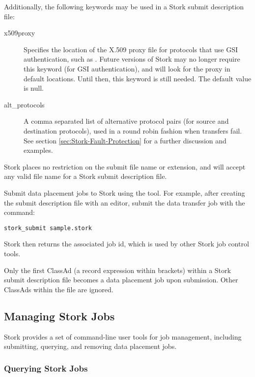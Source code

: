 Additionally, the following keywords may be used in 
a Stork submit description file:

\begin{description}
    \item[x509proxy] Specifies the location of the
    X.509 proxy file for protocols
    that use GSI authentication, such as .
    Future versions of
    Stork may no longer require this keyword (for GSI authentication),
    and will look for the proxy in default locations.
    Until then, this keyword is still needed.
    The default value is null.

    \item[alt\_protocols] A comma separated list of
    alternative protocol pairs (for source and destination protocols),
    used in a round robin fashion
    when transfers fail.
    See section \ref{sec:Stork-Fault-Protection} for a further discussion
    and examples.


\end{description}

Stork places no restriction on the submit file name or extension, and will
accept any valid file name for a Stork submit description file.

Submit data placement jobs to Stork using the
 tool.
For example, after creating the submit description file
 with an
editor, submit the data transfer job with the command:

\begin{verbatim}
stork_submit sample.stork
\end{verbatim}

Stork then returns the associated job id, which is used by other Stork
job control tools.

Only the first ClassAd (a record expression within brackets) within 
a Stork submit description file becomes a data placement job
upon submission.
Other ClassAds within the file are ignored.

\subsection{\label{sec:Stork-Job-Management}Managing Stork Jobs}
Stork provides a set of command-line user tools for job management, including
submitting, querying, and removing data placement jobs.

\subsubsection{\label{sec:stork-query}Querying Stork Jobs}

